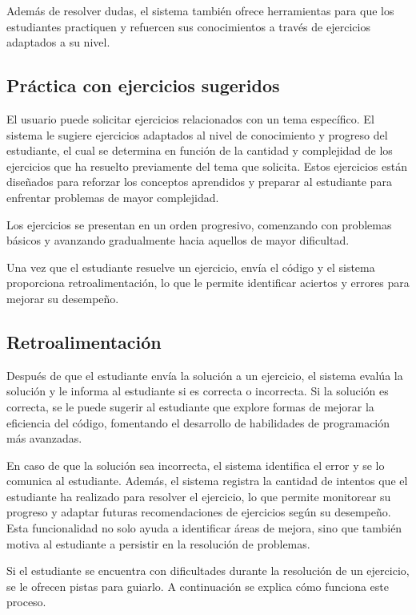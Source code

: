 \documentclass{article}
\begin{document}
Además de resolver dudas, el sistema también ofrece herramientas para que los estudiantes practiquen y refuercen sus conocimientos a través de ejercicios adaptados a su nivel.

\subsection{Práctica con ejercicios sugeridos}

El usuario puede solicitar ejercicios relacionados con un tema específico. El sistema le sugiere ejercicios adaptados al nivel de conocimiento y progreso del estudiante, el cual se determina en función de la cantidad y complejidad de los ejercicios que ha resuelto previamente del tema que solicita. Estos ejercicios están diseñados para reforzar los conceptos aprendidos y preparar al estudiante para enfrentar problemas de mayor complejidad.

Los ejercicios se presentan en un orden progresivo, comenzando con problemas básicos y avanzando gradualmente hacia aquellos de mayor dificultad.

Una vez que el estudiante resuelve un ejercicio, envía el código y el sistema proporciona retroalimentación, lo que le permite identificar aciertos y errores para mejorar su desempeño.

\subsection{Retroalimentación}

Después de que el estudiante envía la solución a un ejercicio, el sistema evalúa la solución y le informa al estudiante si es correcta o incorrecta. Si la solución es correcta, se le puede sugerir al estudiante que explore formas de mejorar la eficiencia del código, fomentando el desarrollo de habilidades de programación más avanzadas.

En caso de que la solución sea incorrecta, el sistema identifica el error y se lo comunica al estudiante. Además, el sistema registra la cantidad de intentos que el estudiante ha realizado para resolver el ejercicio, lo que permite monitorear su progreso y adaptar futuras recomendaciones de ejercicios según su desempeño. Esta funcionalidad no solo ayuda a identificar áreas de mejora, sino que también motiva al estudiante a persistir en la resolución de problemas.

Si el estudiante se encuentra con dificultades durante la resolución de un ejercicio, se le ofrecen pistas para guiarlo. A continuación se explica cómo funciona este proceso.
\end{document}
